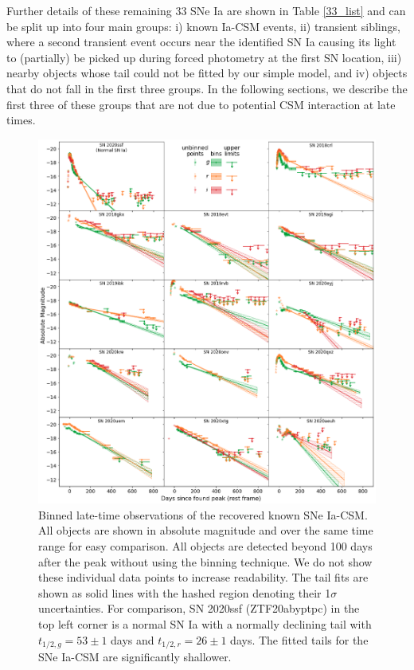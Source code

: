 \documentclass[a4paper,oneside,12pt, class=Latex/Classes/PhDthesisPSnPDF, crop=false]{standalone}
\begin{document}


Further details of these remaining 33 SNe Ia are shown in Table \ref{33_list} and can be split up into four main groups: i) known Ia-CSM events, ii) transient siblings, where a second transient event occurs near the identified SN Ia causing its light to (partially) be picked up during forced photometry at the first SN location, iii) nearby objects whose tail could not be fitted by our simple model, and iv) objects that do not fall in the first three groups. In the following sections, we describe the first three of these groups that are not due to potential CSM interaction at late times. 


\begin{figure}
 \centering
 \includegraphics[width=\textwidth]{../Images/chapter_3/known_CSM_plots.png}
 \caption{Binned late-time observations of the recovered known SNe Ia-CSM. All objects are shown in absolute magnitude and over the same time range for easy comparison. All objects are detected beyond 100 days after the peak without using the binning technique. We do not show these individual data points to increase readability. The tail fits are shown as solid lines with the hashed region denoting their 1$\sigma$ uncertainties. For comparison, SN 2020ssf (ZTF20abyptpc) in the top left corner is a normal SN Ia with a normally declining tail with $t_{1/2,g} = 53 \pm 1$ days and $t_{1/2,r} = 26 \pm 1$ days. The fitted tails for the SNe Ia-CSM are significantly shallower.}
 \label{known_CSM_plots}
\end{figure}
\end{document}
